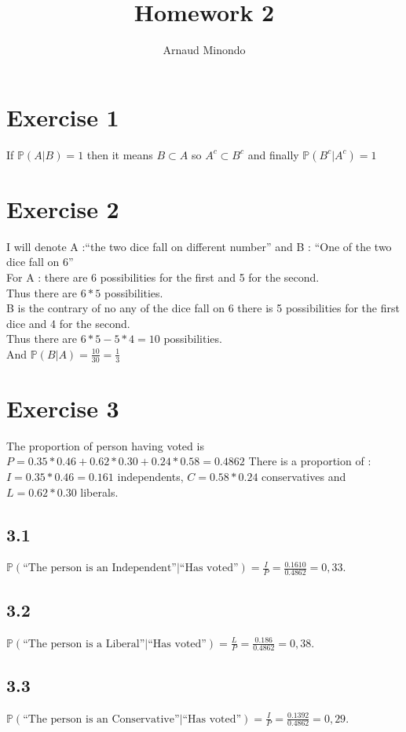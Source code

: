 \documentclass{article}
\title{Homework 2}
\author{Arnaud Minondo}
\begin{document}
    \maketitle

    \section*{Exercise 1}
    If $\mathbb{P}(A|B) = 1$ then it means $B\subset A $ so $A^c\subset B^c$ and finally $\mathbb{P}(B^c|A^c) = 1$
    \section*{Exercise 2}
    I will denote A :``the two dice fall on different number'' and B : ``One of the two dice fall on 6'' 
    \\
    For A : there are 6 possibilities for the first and 5 for the second.
    \\
    Thus there are $6*5$ possibilities.
    \\
    B is the contrary of no any of the dice fall on 6 there is 5 possibilities for the first dice and 4 for the second.
    \\
    Thus there are $6*5-5*4 = 10$ possibilities.
    \\
    And $\mathbb{P}(B|A) = \frac{10}{30} = \frac{1}{3}$
    \section*{Exercise 3}
    The proportion of person having voted is $P = 0.35*0.46 + 0.62*0.30+0.24*0.58 = 0.4862$
    There is a proportion of : $I = 0.35*0.46 = 0.161$ independents, $C = 0.58*0.24$ conservatives and $L = 0.62*0.30$ liberals.
    \subsection*{3.1}
    $\mathbb{P}(\text{``The person is an Independent''}|\text{``Has voted''}) = \frac{I}{P} = \frac{0.1610}{0.4862} = 0,33$.
    \subsection*{3.2}
    $\mathbb{P}(\text{``The person is a Liberal''}|\text{``Has voted''}) = \frac{L}{P} = \frac{0.186}{0.4862} = 0,38$.
    \subsection*{3.3}
    $\mathbb{P}(\text{``The person is an Conservative''}|\text{``Has voted''}) = \frac{I}{P} = \frac{0.1392}{0.4862} = 0,29$.
\end{document}
